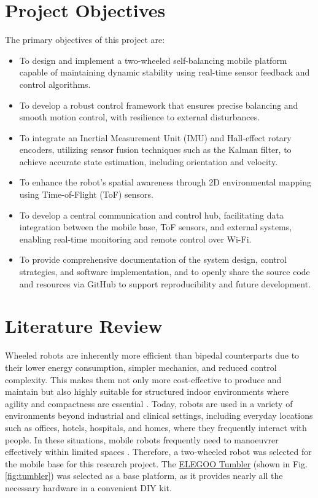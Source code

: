 \section{Project Objectives}
The primary objectives of this project are:

\begin{itemize}
	\item To design and implement a two-wheeled self-balancing mobile platform capable of maintaining dynamic stability using real-time sensor feedback and control algorithms.
	\item To develop a robust control framework that ensures precise balancing and smooth motion control, with resilience to external disturbances.
	\item To integrate an Inertial Measurement Unit (IMU) and Hall-effect rotary encoders, utilizing sensor fusion techniques such as the Kalman filter, to achieve accurate state estimation, including orientation and velocity.
	\item To enhance the robot’s spatial awareness through 2D environmental mapping using Time-of-Flight (ToF) sensors.
	\item To develop a central communication and control hub, facilitating data integration between the mobile base, ToF sensors, and external systems, enabling real-time monitoring and remote control over Wi-Fi.
	\item To provide comprehensive documentation of the system design, control strategies, and software implementation, and to openly share the source code and resources via GitHub to support reproducibility and future development.
\end{itemize}



\section{Literature Review}
Wheeled robots are inherently more efficient than bipedal counterparts due to their lower energy consumption, simpler mechanics, and reduced control complexity. This makes them not only more cost-effective to produce and maintain but also highly suitable for structured indoor environments where agility and compactness are essential \cite{bjelonic_survey_2023}. Today, robots are used in a variety of environments beyond industrial and clinical settings, including everyday locations such as offices, hotels, hospitals, and homes, where they frequently interact with people. In these situations, mobile robots frequently need to manoeuvrer effectively within limited spaces \cite{kim2010practical}. Therefore, a two-wheeled robot was selected for the mobile base for this research project. The \href{https://www.elegoo.com/products/elegoo-tumbller-self-balancing-robot-car}{ELEGOO Tumbler} (shown in Fig. \ref{fig:tumbler}) was selected as a base platform, as it provides nearly all the necessary hardware in a convenient DIY kit.

